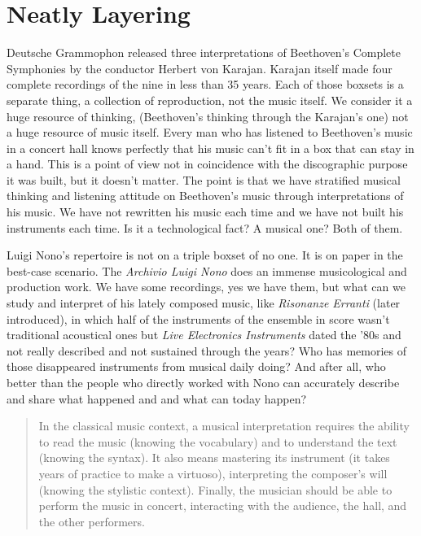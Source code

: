 \documentclass[twoside,a4paper]{article}
\begin{document}
\section{Neatly Layering}
\label{sec:layering}

Deutsche Grammophon released three interpretations of Beethoven's Complete Symphonies by the conductor Herbert von Karajan. Karajan itself made four complete recordings of the nine in less than 35 years\cite{rrrnyt}. Each of those boxsets is a separate thing, a collection of reproduction, not the music itself. We consider it a huge resource of thinking, (Beethoven's thinking through the Karajan's one) not a huge resource of music itself. Every man who has listened to Beethoven's music in a concert hall knows perfectly that his music can't fit in a box that can stay in a hand. This is a point of view not in coincidence with the discographic purpose it was built, but it doesn't matter. The point is that we have stratified musical thinking and listening attitude on Beethoven's music through interpretations of his music. We have not rewritten his music each time and we have not built his instruments each time. Is it a technological fact? A musical one? Both of them.

Luigi Nono's repertoire is not on a triple boxset of no one. It is on paper in the best-case scenario. The \emph{Archivio Luigi Nono} does an immense musicological and production work. We have some recordings, yes we have them, but what can we study and interpret of his lately composed music, like \emph{Risonanze Erranti} (later introduced), in which half of the instruments of the ensemble in score wasn't traditional acoustical ones but \emph{Live Electronics Instruments} dated the '80s and not really described and not sustained through the years? Who has memories of those disappeared instruments from musical daily doing? And after all, who better than the people who directly worked with Nono can accurately describe and share what happened and and what can today happen?

\begin{quote}
In the classical music context, a musical interpretation requires the ability to read the music (knowing the vocabulary) and to understand the text (knowing the syntax). It also means mastering its instrument (it takes years of practice to make a virtuoso), interpreting the composer’s will (knowing the stylistic context). Finally, the musician should be able to perform the music in concert, interacting with the audience, the hall, and the other performers\cite{Lem16}.
\end{quote}
\end{document}
